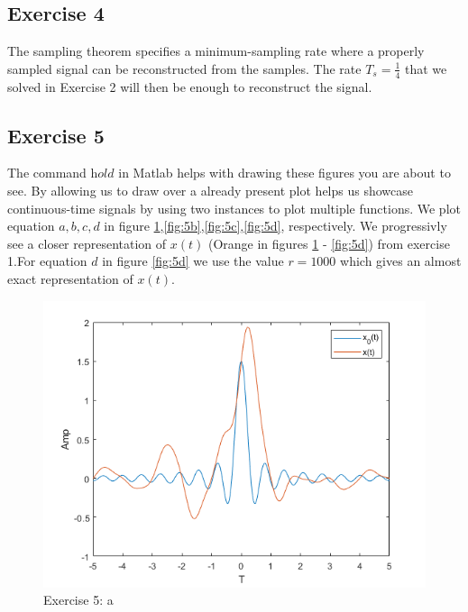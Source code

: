 \documentclass[a4paper]{article}
\begin{document}
\subsection{Exercise 4}
The sampling theorem specifies a minimum-sampling rate where a properly sampled signal can be reconstructed from the samples. The rate $T_s = \frac{1}{4}$ that we solved in Exercise 2 will then be enough to reconstruct the signal.

\subsection{Exercise 5}
The command $\textit{hold}$ in Matlab helps with drawing these figures you are about to see. By allowing us to draw over a already present plot helps us showcase continuous-time signals by using two instances to plot multiple functions.
We plot equation $a,b,c,d$ in figure \ref{fig:5a},\ref{fig:5b},\ref{fig:5c},\ref{fig:5d}, respectively. We progressivly see a closer representation of $x(t)$ (Orange in figures \ref{fig:5a} - \ref{fig:5d}) from exercise 1.For equation $d$ in figure \ref{fig:5d} we use the value $r = 1000$ which gives an almost exact representation of $x(t)$. \\

\begin{figure}
    \centering
    \includegraphics{5a.png}
    \caption{Exercise 5: a}
    \label{fig:5a}
\end{figure}
\end{document}
